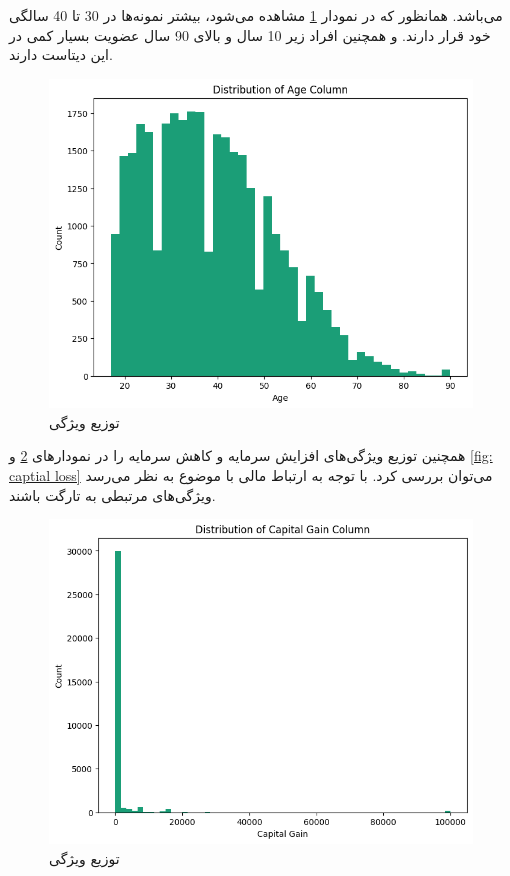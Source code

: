 \documentclass{article}
\begin{document}
	می‌باشد. همانظور که در نمودار 
	\ref{fig: age dist}
	مشاهده می‌شود، بیشتر نمونه‌ها در 30 تا 40 سالگی خود قرار دارند. و همچنین افراد زیر 10 سال و بالای 90 سال عضویت بسیار کمی در این دیتاست دارند.\\
	\begin{figure}[H]
		\centering
		\includegraphics[scale=0.5]{figs/age_dist}
		\caption{
			توزیع ویژگی 
		}
		\label{fig: age dist}
	\end{figure}
	همچنین توزیع ویژگی‌های افزایش سرمایه و کاهش سرمایه را در نمودارهای 
	\ref{fig: captial gain}
	و
	\ref{fig: captial loss}
	 می‌توان بررسی کرد. با توجه به ارتباط مالی با موضوع به نظر می‌رسد ویژگی‌های مرتبطی به تارگت باشند.
	\begin{figure}[H]
		\centering
		\includegraphics[scale=0.5]{figs/capital_gain_dist}
		\caption{
			توزیع ویژگی 
		}
		\label{fig: captial gain}
	\end{figure}
\end{document}

